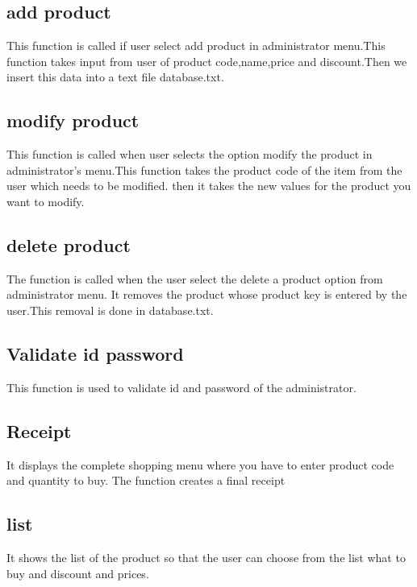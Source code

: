 \documentclass{article}
\begin{document}
\subsection{add product}
This function is called if user select add product in administrator menu.This function takes input from user of product code,name,price and discount.Then we insert this data into a text file database.txt.
\subsection{modify product}
This function is called when user selects the option modify the product in administrator's menu.This function takes the product code of the item from the user which needs to be modified. then it takes the new values for the product you want to modify.
\subsection{delete product}
The function is called when the user select the delete a product option from administrator menu. It removes the product whose product key is entered by the user.This removal is done in database.txt.
\subsection{Validate id password}
This function is used to validate id and password of the administrator.
\subsection{Receipt}
 It displays the complete shopping menu where you have to enter product code and quantity to buy. The function creates a final receipt  
\subsection{list}
It shows the list of the product so that the user can choose from the list what to buy and discount and prices.
\end{document}
